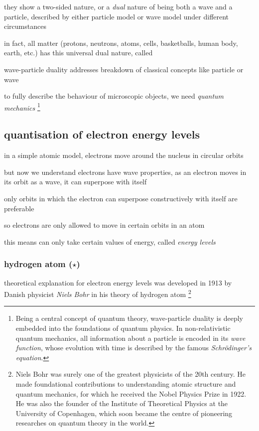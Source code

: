 they show a two-sided nature, or a \emph{dual} nature of being both a wave and a particle, described by either particle model or wave model under different circumstances

in fact, all matter (protons, neutrons, atoms, cells, basketballs, human body, earth, etc.) has this universal dual nature, called 

wave-particle duality addresses breakdown of classical concepts like particle or wave

to fully describe the behaviour of microscopic objects, we need \emph{quantum mechanics}
\footnote{Being a central concept of quantum theory, wave-particle duality is deeply embedded into the foundations of quantum physics. In non-relativistic quantum mechanics, all information about a particle is encoded in its \emph{wave function}, whose evolution with time is described by the famous \emph{Schr\"odinger's equation}.}




\subsection{quantisation of electron energy levels}

in a simple atomic model, electrons move around the nucleus in circular orbits

but now we understand electrons have wave properties, as an electron moves in its orbit as a wave, it can superpose with itself

only orbits in which the electron can superpose constructively with itself are preferable

so electrons are only allowed to move in certain orbits in an atom

this means can only take certain values of energy, called \emph{energy levels}



\subsubsection{hydrogen atom ($\star$)}

theoretical explanation for electron energy levels was developed in 1913 by Danish physicist \emph{Niels Bohr} in his theory of hydrogen atom
\footnote{Niels Bohr was surely one of the greatest physicists of the 20th century. He made foundational contributions to understanding atomic structure and quantum mechanics, for which he received the Nobel Physics Prize in 1922. He was also the founder of the Institute of Theoretical Physics at the University of Copenhagen, which soon became the centre of pioneering researches on quantum theory in the world.}

